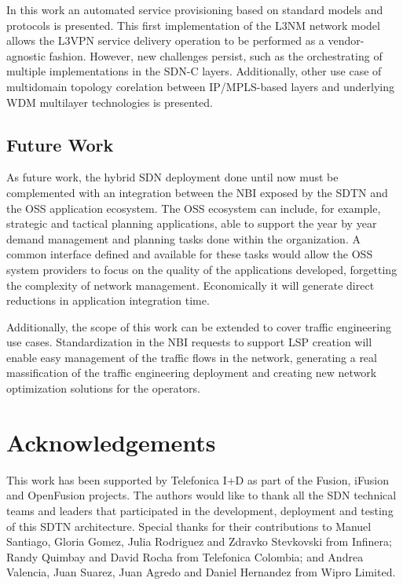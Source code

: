 \documentclass[a4paper,fleqn]{cas-dc}
\begin{document}
In this work an automated service provisioning based on standard models and protocols is presented. This first implementation of the L3NM network model allows the L3VPN service delivery operation to be performed as a vendor-agnostic fashion. However, new challenges persist, such as the orchestrating of multiple implementations in the SDN-C layers. Additionally, other use case of multidomain topology corelation between IP/MPLS-based layers and underlying WDM multilayer technologies is presented. 

\subsection{Future Work}
As future work, the hybrid SDN deployment done until now must be complemented with an integration between the NBI exposed by the SDTN and the OSS application ecosystem. The OSS ecosystem can include, for example, strategic and tactical planning applications, able to support the year by year demand management and planning tasks done within the organization. A common interface defined and available for these tasks would allow the OSS system providers to focus on the quality of the applications developed, forgetting the complexity of network management. Economically it will generate direct reductions in application integration time.

Additionally, the scope of this work can be extended to cover traffic engineering use cases. Standardization in the NBI requests to support LSP creation will enable easy management of the traffic flows in the network, generating a real massification of the traffic engineering deployment and creating new network optimization solutions for the operators.

\printcredits

\section*{Acknowledgements}
This work has been supported by Telefonica I+D as part of the Fusion, iFusion and OpenFusion projects. The authors would like to thank all the SDN technical teams and leaders that participated in the development, deployment and testing of this SDTN architecture. Special thanks for their contributions to Manuel Santiago, Gloria Gomez, Julia Rodriguez and Zdravko Stevkovski from Infinera; Randy Quimbay and David Rocha from Telefonica Colombia; and Andrea Valencia, Juan Suarez, Juan Agredo and Daniel Hernandez from Wipro Limited.   
\end{document}
